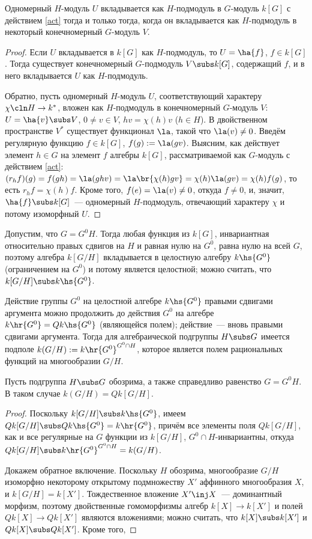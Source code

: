 \documentclass{article}
\begin{document}
\begin{lemma}\label{dim1} Одномерный $H$-модуль $U$ вкладывается как $H$-подмодуль в $G$-модуль $k[G]$ с действием
\eqref{act} тогда и только тогда, когда он вкладывается как $H$-подмодуль в некоторый конечномерный $G$-модуль
$V$.
\end{lemma}
\begin{proof} Если $U$ вкладывается в $k[G]$ как $H$-подмодуль, то $U=\ha{f}$, $f\in k[G]$. Тогда существует
конечномерный $G$-подмодуль $V\subs k[G]$, содержащий $f$, и в него вкладывается $U$ как $H$-подмодуль.

Обратно, пусть одномерный $H$-модуль $U$, соответствующий характеру $\chi\cln H\to k^*$, вложен как $H$-подмодуль
в конечномерный $G$-модуль $V$: $U=\ha{v}\subs V$, $0\ne v\in V$, $hv=\chi(h)v$ ($h\in H$). В двойственном
пространстве $V^*$ существует функционал $\la$, такой что $\la(v)\ne0$. Введём регулярную функцию $f\in k[G]$,
$f(g):=\la(gv)$. Выясним, как действует элемент $h\in G$ на элемент $f$ алгебры $k[G]$, рассматриваемой как
$G$-модуль с действием \eqref{act}: $(r_hf)(g)=f(gh)=\la(ghv)=\la\br{\chi(h)gv}=\chi(h)\la(gv)=\chi(h)f(g)$, то
есть $r_hf=\chi(h)f$. Кроме того, $f(e)=\la(v)\ne0$, откуда $f\ne0$, и, значит, $\ha{f}\subs k[G]$~--- одномерный
$H$-подмодуль, отвечающий характеру $\chi$ и потому изоморфный $U$.
\end{proof}

Допустим, что $G=G^0H$. Тогда любая функция из $k[G]$, инвариантная относительно правых сдвигов на $H$ и равная
нулю на $G^0$, равна нулю на всей $G$, поэтому алгебра $k[G/H]$ вкладывается в целостную алгебру $k\hs{G^0}$
(ограничением на $G^0$) и потому является целостной; можно считать, что $k[G/H]\subs k\hs{G^0}$.

Действие группы $G^0$ на целостной алгебре $k\hs{G^0}$ правыми сдвигами аргумента можно продолжить до действия
$G^0$ на алгебре $k\hr{G^0}=Qk\hs{G^0}$ (являющейся полем); действие~--- вновь правыми сдвигами аргумента. Тогда
для алгебраической подгруппы $H\subs G$ имеется подполе $k(G/H):=k\hr{G^0}^{G^0\cap H}$, которое является полем
рациональных функций на многообразии $G/H$.

\begin{lemma}\label{quot} Пусть подгруппа $H\subs G$ обозрима, а также справедливо равенство $G=G^0H$. В таком
случае $k(G/H)=Qk[G/H]$.
\end{lemma}

\begin{proof} Поскольку $k[G/H]\subs k\hs{G^0}$, имеем $Qk[G/H]\subs Qk\hs{G^0}=k\hr{G^0}$, причём все элементы поля
$Qk[G/H]$, как и все регулярные на $G$ функции из $k[G/H]$, $G^0\cap H$-инвариантны, откуда $Qk[G/H]\subs
k\hr{G^0}^{G^0\cap H}=k(G/H)$.

Докажем обратное включение. Поскольку $H$ обозрима, многообразие $G/H$ изоморфно некоторому открытому подмножеству
$X'$ аффинного многообразия $X$, и $k[G/H]=k[X']$. Тождественное вложение $X'\inj X$~--- доминантный морфизм,
поэтому двойственные гомоморфизмы алгебр $k[X]\to k[X']$ и полей $Qk[X]\to Qk[X']$ являются вложениями; можно
считать, что $k[X]\subs k[X']$ и $Qk[X]\subs Qk[X']$. Кроме того, 
\end{proof}
\end{document}
